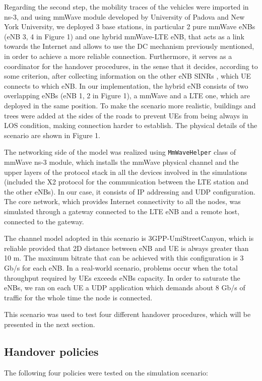 \documentclass[conference,10pt]{IEEEtran}
\begin{document}
Regarding the second step, the mobility traces of the vehicles were imported in ns-3, and using mmWave module developed by University of Padova and New York University, we deployed 3 base stations, in particular 2 pure mmWave eNBs (eNB 3, 4 in Figure 1) and one hybrid mmWave-LTE eNB, that acts as a link towards the Internet and allows to use the DC mechanism previously mentioned, in order to achieve a more reliable connection. Furthermore, it serves as a coordinator for the handover procedures, in the sense that it decides, according to some criterion, after collecting information on the other eNB SINRs , which UE connects to which eNB. In our implementation, the hybrid eNB consists of two overlapping eNBs (eNB 1, 2 in Figure 1), a mmWave and a LTE one, which are deployed in the same position. To make the scenario more realistic, buildings and trees were added at the sides of the roads to prevent UEs from being always in LOS condition, making connection harder to establish. The physical details of the scenario are shown in Figure 1.


The networking side of the model was realized using \texttt{MmWaveHelper} class of mmWave ns-3 module, which installs the mmWave physical channel and the upper layers of the protocol stack in all the devices involved in the simulations (included the X2 protocol for the communication between the LTE station and the other eNBs). In our case, it consists of IP addressing and UDP configuration. The core network, which provides Internet connectivity to all the nodes, was simulated through a gateway connected to the LTE eNB and a remote host, connected to the gateway. 

The channel model adopted in this scenario is 3GPP-UmiStreetCanyon, which is reliable provided that 2D distance between eNB and UE is always greater than 10 m. The maximum bitrate that can be achieved with this configuration is 3 Gb/s for each eNB. In a real-world scenario, problems occur when the total throughput required by UEs exceeds eNBs capacity. In order to saturate the eNBs, we ran on each UE a UDP application which demands about 8 Gb/s of traffic for the whole time the node is connected.

This scenario was used to test four different handover procedures, which will be presented in the next section.



\noindent
\subsection{Handover policies}
The following four policies were tested on the simulation scenario:
\end{document}
